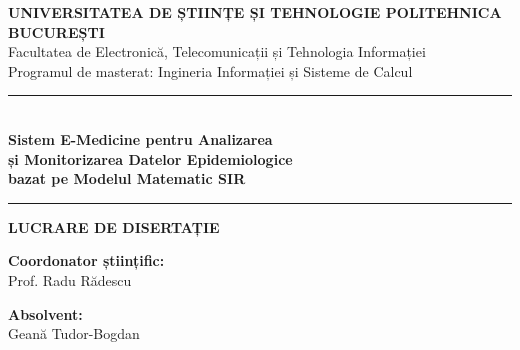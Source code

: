 \documentclass[12pt, a4paper, oneside]{report}
\theoremstyle{plain}
\theoremstyle{definition}
\theoremstyle{remark}
\begin{document}
\begin{titlepage}
    \centering
    \vspace*{1cm}

    {\Large\textbf{UNIVERSITATEA DE ȘTIINȚE ȘI TEHNOLOGIE POLITEHNICA BUCUREȘTI}}\\[0.4cm]
    {\large Facultatea de Electronică, Telecomunicații și Tehnologia Informației}\\[0.2cm]
    {\large Programul de masterat: Ingineria Informației și Sisteme de Calcul}

    \vspace{2.5cm}

    \rule{\textwidth}{1.5pt}\\[0.4cm]
    {\LARGE\bfseries
        Sistem E-Medicine pentru Analizarea\\[0.3cm]
        și Monitorizarea Datelor Epidemiologice\\[0.3cm]
        bazat pe Modelul Matematic SIR
    }\\[0.4cm]
    \rule{\textwidth}{1.5pt}

    \vspace{1cm}
    {\large\textbf{LUCRARE DE DISERTAȚIE}}

    \vspace{2.5cm}

    \begin{minipage}[t]{0.48\textwidth}
        \begin{flushleft}
            \textbf{Coordonator științific:}\\[0.2cm]
            Prof. Radu Rădescu
        \end{flushleft}
    \end{minipage}
    \hfill
    \begin{minipage}[t]{0.48\textwidth}
        \begin{flushright}
            \textbf{Absolvent:}\\[0.2cm]
            Geană Tudor-Bogdan
        \end{flushright}
    \end{minipage}

    \vfill
    {\large \the\year}
\end{titlepage}

\setcounter{page}{1}
\end{document}
